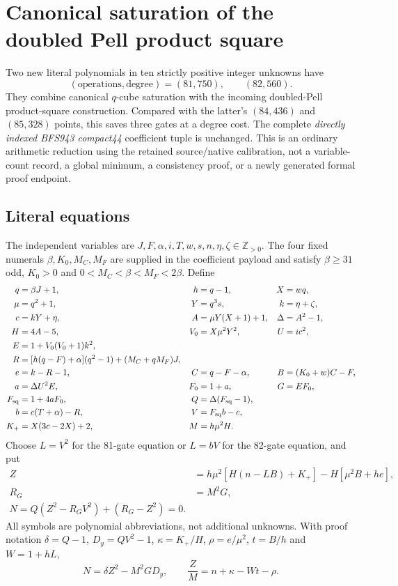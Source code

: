 \documentclass[11pt]{article}
\begin{document}
\section{Canonical saturation of the doubled Pell product square}
\label{sec:positive81}
Two new literal polynomials in ten strictly positive integer unknowns have
\[
 (\text{operations},\text{degree})=(81,750),\qquad(82,560).
\]
They combine canonical $q$-cube saturation with the incoming doubled-Pell
product-square construction. Compared with the latter's $(84,436)$ and
$(85,328)$ points, this saves three gates at a degree cost. The complete
\emph{directly indexed BFS943 compact44} coefficient tuple is unchanged.
This is an ordinary arithmetic reduction using the retained source/native
calibration, not a variable-count record, a global minimum, a consistency
proof, or a newly generated formal proof endpoint.

\subsection{Literal equations}
The independent variables are
$J,F,\alpha,i,T,w,s,n,\eta,\zeta\in\mathbb Z_{>0}$.
The four fixed numerals $\beta,K_0,M_C,M_F$ are supplied in the coefficient
payload and satisfy $\beta\ge31$ odd, $K_0>0$ and
$0<M_C<\beta<M_F<2\beta$. Define
\begin{align*}
q&=\beta J+1,& h&=q-1,& X&=wq,\\
\mu&=q^2+1,&Y&=q^3s,&k&=\eta+\zeta,\\
c&=kY+\eta,&A&=\mu Y(X+1)+1,&\Delta&=A^2-1,\\
H&=4A-5,&V_0&=X\mu^2Y^2,&U&=ic^2,\\
E&=1+V_0(V_0+1)k^2,\\
R&=[h(q-F)+\alpha](q^2-1)+(M_C+qM_F)J,\\
e&=k-R-1,&C&=q-F-\alpha,&B&=(K_0+w)C-F,\\
a&=\Delta U^2E,&F_0&=1+a,&G&=EF_0,\\
F_{\rm sq}&=1+4aF_0,&Q&=\Delta(F_{\rm sq}-1),\\
b&=c(T+\alpha)-R,&V&=F_{\rm sq}b-c,\\
K_+&=X(3c-2X)+2,&M&=h\mu^2H.
\end{align*}
Choose $L=V^2$ for the 81-gate equation or $L=bV$ for the 82-gate equation,
and put
\begin{align*}
 Z&=h\mu^2[H(n-LB)+K_+]-H[\mu^2B+he],\\
 R_G&=M^2G,\\
 \boxed{N=Q(Z^2-R_GV^2)+(R_G-Z^2)=0.}
\end{align*}
All symbols are polynomial abbreviations, not additional unknowns.
With proof notation $\delta=Q-1$, $D_y=QV^2-1$,
$\kappa=K_+/H$, $\rho=e/\mu^2$, $t=B/h$ and $W=1+hL$,
\begin{equation}
 N=\delta Z^2-M^2GD_y,
 \qquad \frac ZM=n+\kappa-Wt-\rho.
 \label{eq:positive81-carrier}
\end{equation}
\end{document}
